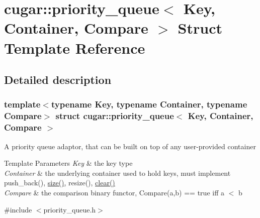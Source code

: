 \hypertarget{structcugar_1_1priority__queue}{}\section{cugar\+:\+:priority\+\_\+queue$<$ Key, Container, Compare $>$ Struct Template Reference}
\label{structcugar_1_1priority__queue}


\subsection{Detailed description}
\subsubsection*{template$<$typename Key, typename Container, typename Compare$>$\newline
struct cugar\+::priority\+\_\+queue$<$ Key, Container, Compare $>$}

A priority queue adaptor, that can be built on top of any user-\/provided container


\begin{DoxyTemplParams}{Template Parameters}
{\em Key} & the key type \\
\hline
{\em Container} & the underlying container used to hold keys, must implement push\+\_\+back(), \hyperlink{structcugar_1_1priority__queue_aa75b22d30695f86f47dba642f44a4774}{size()}, resize(), \hyperlink{structcugar_1_1priority__queue_ae83fdf473503faff06093363f2fbd9de}{clear()} \\
\hline
{\em Compare} & the comparison binary functor, Compare(a,b) == true iff a $<$ b \\
\hline
\end{DoxyTemplParams}


{\ttfamily \#include $<$priority\+\_\+queue.\+h$>$}

